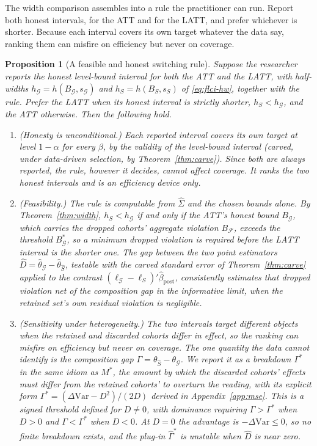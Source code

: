 \documentclass[12pt]{article}
\newtheorem{proposition}{Proposition}
\theoremstyle{remark}
\begin{document}
The width comparison assembles into a rule the practitioner can run. Report both honest
intervals, for the ATT and for the LATT, and prefer whichever is shorter. Because each interval covers its
own target whatever the data say, ranking them can misfire on efficiency but never on coverage.

\begin{proposition}[A feasible and honest switching rule]\label{prop:switch}
Suppose the researcher reports the honest level-bound interval for both the ATT and the LATT, with
half-widths $h_{\mathcal G}=h(B_{\mathcal G},s_{\mathcal G})$ and $h_S=h(B_S,s_S)$ of \eqref{eq:flci-hw},
together with the rule. Prefer the LATT when its honest interval is strictly shorter, $h_S<h_{\mathcal G}$,
and the ATT otherwise. Then the following hold.
\begin{enumerate}
\item[(i)] (Honesty is unconditional.) Each reported interval covers its own target at level
$1-\alpha$ for every $\beta$, by the validity of the level-bound interval (carved, under data-driven
selection, by Theorem~\ref{thm:carve}). Since both are always reported, the rule, however it
decides, cannot affect coverage. It ranks the two honest intervals and is an efficiency device only.
\item[(ii)] (Feasibility.) The rule is computable from $\hat\Sigma$ and the chosen bounds alone. By
Theorem~\ref{thm:width}, $h_S<h_{\mathcal G}$ if and only if the ATT's honest bound $B_{\mathcal G}$, which
carries the dropped cohorts' aggregate violation $B_{\mathcal F}$, exceeds the threshold
$B_{\mathcal G}^\ast$, so a minimum dropped violation is required before the LATT interval is the shorter
one. The gap between the two point estimators $\hat D=\hat\theta_{\mathcal G}-\hat\theta_{\hat S}$, testable
with the carved standard error of Theorem~\ref{thm:carve} applied to the contrast
$(\ell_{\mathcal G}-\ell_S)'\hat\beta_{\mathrm{post}}$, consistently estimates that dropped violation net
of the composition gap in the informative limit, when the retained set's own residual violation is
negligible.
\item[(iii)] (Sensitivity under heterogeneity.) The two intervals target different objects when the
retained and discarded cohorts differ in effect, so the ranking can misfire on efficiency but never on
coverage. The one quantity the data cannot identify is the composition gap
$\Gamma=\theta_{\hat S}-\theta_{\mathcal G}$. We report it as a breakdown $\Gamma^\ast$ in the same idiom as
$M^\ast$, the amount by which the discarded cohorts' effects must differ from the retained cohorts' to
overturn the reading, with its explicit form $\Gamma^\ast=(\Delta\mathrm{Var}-D^2)/(2D)$ derived in
Appendix~\ref{app:mse}. This is a signed threshold defined for $D\neq0$, with dominance requiring
$\Gamma>\Gamma^\ast$ when $D>0$ and $\Gamma<\Gamma^\ast$ when $D<0$. At $D=0$ the advantage is
$-\Delta\mathrm{Var}\le0$, so no finite breakdown exists, and the plug-in $\hat\Gamma^\ast$ is unstable when
$\hat D$ is near zero.
\end{enumerate}
\end{proposition}
\end{document}
